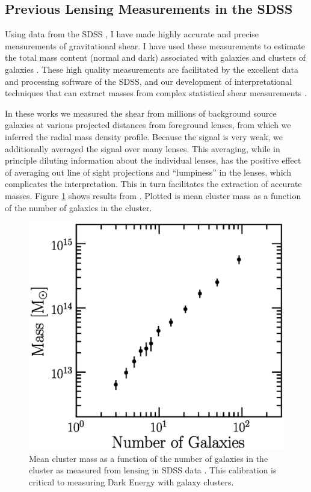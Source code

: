 \documentclass[12pt]{article}
\begin{document}
\subsection{Previous Lensing Measurements in the SDSS} \label{sec:sdssold}

Using data from the SDSS \cite{York00}, I have made highly accurate and precise
measurements of gravitational shear. I have used these measurements to estimate
the total mass content (normal and dark) associated with galaxies and clusters
of galaxies
\cite{fis00,Sheldon04,SheldonLensing07,JohnstonLensing07,SheldonM2L07}.  These
high quality measurements are facilitated by the excellent data and processing
software of the SDSS, and our development of interpretational techniques that
can extract masses from complex statistical shear measurements
\cite{JohnstonInvert07}.

In these works we measured the shear from millions of background source
galaxies at various projected distances from foreground lenses, from which we
inferred the radial mass density profile.  Because the signal is very weak, we
additionally averaged the signal over many lenses.  This averaging, while in
principle diluting information about the individual lenses, has the positive
effect of averaging out line of sight projections and ``lumpiness'' in the
lenses, which complicates the interpretation.  This in turn facilitates the
extraction of accurate masses.  Figure \ref{fig:massngals} shows results
from \cite{SheldonLensing07,JohnstonLensing07}. Plotted is mean cluster mass as
a function of the number of galaxies in the cluster.  

\begin{figure}[p]
\centering
\includegraphics[scale=0.7]{mass-rich-plot.eps}
\caption{Mean cluster mass as a function of the number of
galaxies in the cluster as measured from lensing in SDSS
data \cite{SheldonLensing07,JohnstonLensing07}. This calibration
is critical to measuring Dark Energy with galaxy clusters.\label{fig:massngals}}
\end{figure}
\end{document}
